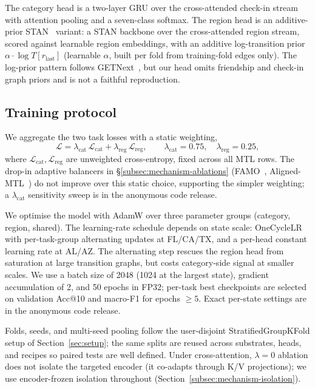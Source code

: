 The category head is a two-layer GRU over the cross-attended check-in stream with attention pooling and a seven-class softmax. The region head is an additive-prior STAN~\cite{luo2021stan} variant: a STAN backbone over the cross-attended region stream, scored against learnable region embeddings, with an additive log-transition prior $\alpha\cdot\log T[r_{\text{last}}]$ (learnable $\alpha$, built per fold from training-fold edges only). The log-prior pattern follows GETNext~\cite{yang2022getnext}, but our head omits friendship and check-in graph priors and is not a faithful reproduction.

\subsection{Training protocol}
\label{subsec:method-training}

We aggregate the two task losses with a static weighting,
\begin{equation}
\mathcal{L} = \lambda_{\text{cat}}\,\mathcal{L}_{\text{cat}} + \lambda_{\text{reg}}\,\mathcal{L}_{\text{reg}},
\qquad
\lambda_{\text{cat}} = 0.75,\quad \lambda_{\text{reg}} = 0.25,
\label{eq:loss}
\end{equation}
where $\mathcal{L}_{\text{cat}}, \mathcal{L}_{\text{reg}}$ are unweighted cross-entropy, fixed across all MTL rows. The drop-in adaptive balancers in \S\ref{subsec:mechanism-ablations} (FAMO~\cite{liu2023famo}, Aligned-MTL~\cite{senushkin2023aligned}) do not improve over this static choice, supporting the simpler weighting; a $\lambda_{\text{cat}}$ sensitivity sweep is in the anonymous code release.

We optimise the model with AdamW over three parameter groups (category, region, shared). The learning-rate schedule depends on state scale: OneCycleLR with per-task-group alternating updates at FL/CA/TX, and a per-head constant learning rate at AL/AZ. The alternating step rescues the region head from saturation at large transition graphs, but costs category-side signal at smaller scales. We use a batch size of 2048 (1024 at the largest state), gradient accumulation of 2, and 50 epochs in FP32; per-task best checkpoints are selected on validation Acc@10 and macro-F1 for epochs $\geq 5$. Exact per-state settings are in the anonymous code release.

Folds, seeds, and multi-seed pooling follow the user-disjoint StratifiedGroupKFold setup of Section~\ref{sec:setup}; the same splits are reused across substrates, heads, and recipes so paired tests are well defined. Under cross-attention, $\lambda=0$ ablation does not isolate the targeted encoder (it co-adapts through K/V projections); we use encoder-frozen isolation throughout (Section~\ref{subsec:mechanism-isolation}).
